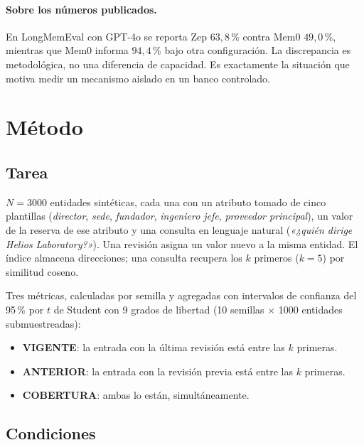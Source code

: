 \documentclass[11pt,a4paper]{article}
\begin{document}
\paragraph{Sobre los números publicados.} En LongMemEval con GPT-4o se reporta Zep $63{,}8\,\%$
contra Mem0 $49{,}0\,\%$, mientras que Mem0 informa $94{,}4\,\%$ bajo otra configuración. La
discrepancia es metodológica, no una diferencia de capacidad. Es exactamente la situación que motiva
medir un mecanismo aislado en un banco controlado.

\section{Método}
\label{sec:method}

\subsection{Tarea}

$N = 3000$ entidades sintéticas, cada una con un atributo tomado de cinco plantillas
(\emph{director}, \emph{sede}, \emph{fundador}, \emph{ingeniero jefe}, \emph{proveedor principal}),
un valor de la reserva de ese atributo y una consulta en lenguaje natural (\emph{«¿quién dirige
Helios Laboratory?»}). Una revisión asigna un valor nuevo a la misma entidad. El índice almacena
direcciones; una consulta recupera los $k$ primeros ($k=5$) por similitud coseno.

Tres métricas, calculadas por semilla y agregadas con intervalos de confianza del 95\,\% por $t$ de
Student con 9 grados de libertad (10 semillas $\times$ 1000 entidades submuestreadas):

\begin{itemize}
\item \textbf{VIGENTE}: la entrada con la última revisión está entre las $k$ primeras.
\item \textbf{ANTERIOR}: la entrada con la revisión previa está entre las $k$ primeras.
\item \textbf{COBERTURA}: ambas lo están, simultáneamente.
\end{itemize}

\subsection{Condiciones}
\end{document}
